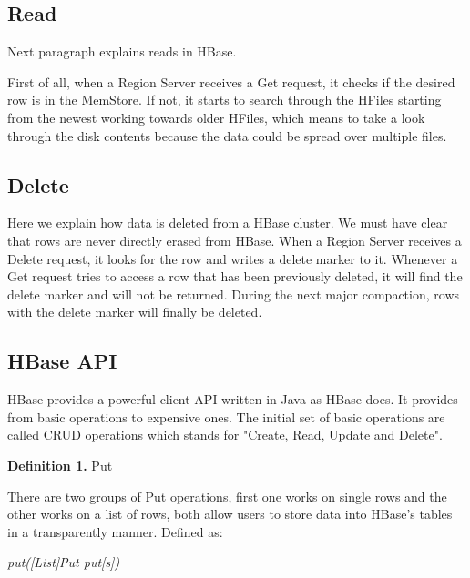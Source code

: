 \subsection{Read}
Next paragraph explains reads in HBase.
\par
First of all, when a Region Server receives a Get request, it checks if the desired row is in the MemStore. If not, it starts to search through the HFiles starting from the newest working towards older HFiles, which means to take a look through the disk contents because the data could be spread over multiple files.

\subsection{Delete}
Here we explain how data is deleted from a HBase cluster. We must have clear that rows are never directly erased from HBase. When a Region Server receives a Delete request, it looks for the row and writes a delete marker to it. Whenever a Get request tries to access a row that has been previously deleted, it will find the delete marker and will not be returned. During the next major compaction, rows with the delete marker will finally be deleted.

\subsection {HBase API}

HBase provides a powerful client API written in Java as HBase does. It provides from basic operations to expensive ones. The initial set of basic operations are called CRUD operations which stands for "Create, Read, Update and Delete".

\bigskip


\textbf{Definition 1. }Put 

There are two groups of Put operations, first one works on single rows and the other works on a list of rows, both allow users to store data into HBase's tables in a transparently manner. Defined as:
\par
\bigskip
\centerline{\textit{put([List]Put put[s])}}
\bigskip

